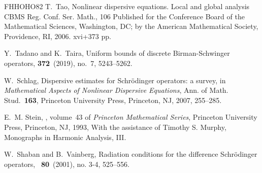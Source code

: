 \documentclass[reqno, 11pt]{amsart}
\numberwithin{equation}{section}
\begin{document}
\begin{thebibliography}{FHHOHO82}
T.~Tao,
Nonlinear dispersive equations.
Local and global analysis
CBMS Reg. Conf. Ser. Math., 106
Published for the Conference Board of the Mathematical Sciences, Washington, DC; by the American Mathematical Society, Providence, RI, 2006. xvi+373 pp.

Y.~Tadano and K.~Taira, 
\newblock Uniform bounds of discrete Birman-Schwinger operators,
 {\bf 372}~(2019), no.~7, 5243--5262.

W.~Schlag,
\newblock Dispersive estimates for {S}chr\"odinger operators: a survey,
\newblock in {\em Mathematical Aspects of Nonlinear Dispersive Equations},
  Ann. of Math. Stud.~{\bf163}, Princeton University Press,
  Princeton, NJ, 2007, 255--285.

E.~M. Stein,
, volume~43 of {\em Princeton Mathematical Series},
\newblock Princeton University Press, Princeton, NJ, 1993,
\newblock With the assistance of Timothy S. Murphy, Monographs in Harmonic
  Analysis, III.

W.~Shaban and B.~Vainberg,
\newblock Radiation conditions for the difference {S}chr\"odinger operators,
~{\bf80}~(2001), no. 3-4, 525--556.


\end{thebibliography}
\end{document}

